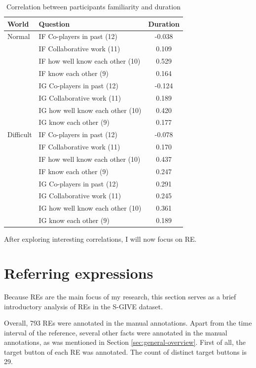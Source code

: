 \begin{table}[!htbp]
 \centering
\begin{tabular}{llc}
\toprule
World & Question  & Duration \\
\midrule
Normal 	& IF Co-players in past (12) 	& -0.038\\
 		& IF Collaborative work 	(11)		& 0.109	 \\
 		& IF how well know each other (10)		& 0.529\\
 		& IF know each other (9)			& 0.164	\\
 		& IG Co-players in past (12) 	& -0.124\\
 		& IG Collaborative work 	(11)		& 0.189	 \\
 		& IG how well know each other (10)		& 0.420\\
 		& IG know each other (9)			& 0.177	\\ 		
\midrule
Difficult& IF Co-players in past (12) 	& -0.078\\
 		& IF Collaborative work 	(11)		& 0.170	 \\
  		& IF how well know each other (10)		& 0.437\\
 		& IF know each other (9)			& 0.247	\\
 		& IG Co-players in past (12) 	& 0.291\\
 		& IG Collaborative work 	(11)		& 0.245	 \\
 		& IG how well know each other (10)		& 0.361\\
 		& IG know each other (9)			& 0.189	\\
\bottomrule
\end{tabular}
\caption{Correlation between participants familiarity and duration}
\label{tab:demfactors-famother}
\end{table}

After exploring interesting correlations, I will now focus on RE.

\section{Referring expressions}
Because REs are the main focus of my research, this section serves as a brief introductory analysis of REs in the S-GIVE dataset.

Overall, 793 REs were annotated in the manual annotations. Apart from the time interval of the reference, several other facts were annotated in the manual annotations, as was mentioned in Section \ref{sec:general-overview}. First of all, the target button of each RE was annotated. The count of distinct target buttons is 29.  

